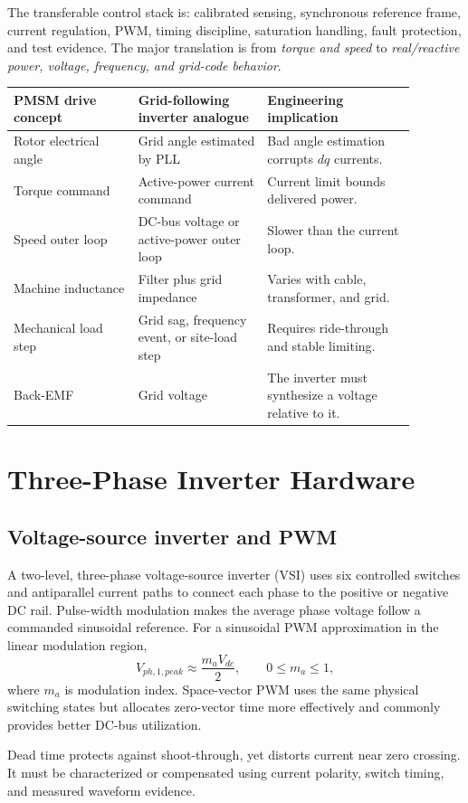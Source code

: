 \documentclass[11pt]{article}
\begin{document}
The transferable control stack is: calibrated sensing, synchronous reference frame, current regulation, PWM, timing discipline, saturation handling, fault protection, and test evidence. The major translation is from \emph{torque and speed} to \emph{real/reactive power, voltage, frequency, and grid-code behavior}.

\begin{longtable}{p{0.27\linewidth}p{0.29\linewidth}p{0.32\linewidth}}
\toprule
PMSM drive concept & Grid-following inverter analogue & Engineering implication \\
\midrule
Rotor electrical angle & Grid angle estimated by PLL & Bad angle estimation corrupts $dq$ currents. \\
Torque command & Active-power current command & Current limit bounds delivered power. \\
Speed outer loop & DC-bus voltage or active-power outer loop & Slower than the current loop. \\
Machine inductance & Filter plus grid impedance & Varies with cable, transformer, and grid. \\
Mechanical load step & Grid sag, frequency event, or site-load step & Requires ride-through and stable limiting. \\
Back-EMF & Grid voltage & The inverter must synthesize a voltage relative to it. \\
\bottomrule
\end{longtable}

\section{Three-Phase Inverter Hardware}
\subsection{Voltage-source inverter and PWM}
A two-level, three-phase voltage-source inverter (VSI) uses six controlled switches and antiparallel current paths to connect each phase to the positive or negative DC rail. Pulse-width modulation makes the average phase voltage follow a commanded sinusoidal reference. For a sinusoidal PWM approximation in the linear modulation region,
\[
V_{ph,1,peak}\approx \frac{m_aV_{dc}}{2},\qquad 0\leq m_a\leq1,
\]
where $m_a$ is modulation index. Space-vector PWM uses the same physical switching states but allocates zero-vector time more effectively and commonly provides better DC-bus utilization.

Dead time protects against shoot-through, yet distorts current near zero crossing. It must be characterized or compensated using current polarity, switch timing, and measured waveform evidence.
\end{document}

